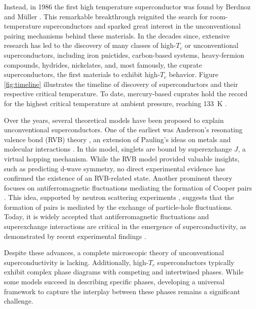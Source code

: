Instead, in 1986 the first high temperature superconductor was found by Berdnoz and Müller \cite{bednorz_possible_1986}.
This remarkable breakthrough reignited the search for room-temperature superconductors and sparked great interest in the unconventional pairing mechanisms behind these materials.
In the decades since, extensive research has led to the discovery of many classes of high-$T_c$ or unconventional superconductors, including iron pnictides, carbon-based systems, heavy-fermion compounds, hydrides, nickelates, and, most famously, the cuprate superconductors, the first materials to exhibit high-$T_c$ behavior.
Figure \ref{fig:timeline} illustrates the timeline of discovery of superconductors and their respective critical temperature.
To date, mercury-based cuprates hold the record for the highest critical temperature at ambient pressure, reaching \qty{133}{\kelvin} \cite{schilling_superconductivity_1993}.

Over the years, several theoretical models have been proposed to explain unconventional superconductors.
One of the earliest was Anderson's resonating valence bond (RVB) theory \cite{anderson_resonating_1973, anderson_resonating--valence-bond_1987}, an extension of Pauling's ideas on metals and molecular interactions \cite{pauling_nature_1938, pauling_nature_1948}.
In this model, singlets are bound by superexchange $J$, a virtual hopping mechanism.
While the RVB model provided valuable insights, such as predicting d-wave symmetry, no direct experimental evidence has confirmed the existence of an RVB-related state.
Another prominent theory focuses on antiferromagnetic fluctuations mediating the formation of Cooper pairs \cite{bickers_cdw_1987}.
This idea, supported by neutron scattering experiments \cite{mook_polarized_1993, hayden_structure_2004, dahm_strength_2009}, suggests that the formation of pairs is mediated by the exchange of particle-hole fluctuations.
Today, it is widely accepted that antiferromagnetic fluctuations and superexchange interactions are critical in the emergence of superconductivity, as demonstrated by recent experimental findings \cite{kowalski_oxygen_2021, omahony_electron_2022}.

Despite these advances, a complete microscopic theory of unconventional superconductivity is lacking.
Additionally, high-$T_c$ superconductors typically exhibit complex phase diagrams with competing and intertwined phases.
While some models succeed in describing specific phases, developing a universal framework to capture the interplay between these phases remains a significant challenge.

